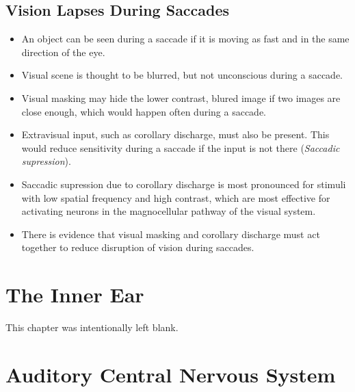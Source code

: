 \documentclass[12pt,a4paper]{article}
\begin{document}
\subsection{Vision Lapses During Saccades}
\begin{itemize}
    \item An object can be seen during a saccade if it is moving as fast and in the same direction of the eye.
    \item Visual scene is thought to be blurred, but not unconscious during a saccade.
    \item Visual masking may hide the lower contrast, blured image if two images are close enough, which would happen often during a saccade.
    \item Extravisual input, such as corollary discharge, must also be present. This would reduce sensitivity during a saccade if the input is not there (\textit{Saccadic supression}).
    \item Saccadic supression due to corollary discharge is most pronounced for stimuli with low spatial frequency and high contrast, which are most effective for activating neurons in the magnocellular pathway of the visual system. 
    \item There is evidence that visual masking and corollary discharge must act together to reduce disruption of vision during saccades.
\end{itemize}

\clearpage
\section{The Inner Ear}
    This chapter was intentionally left blank. 

\clearpage
\section{Auditory Central Nervous System}
\end{document}
